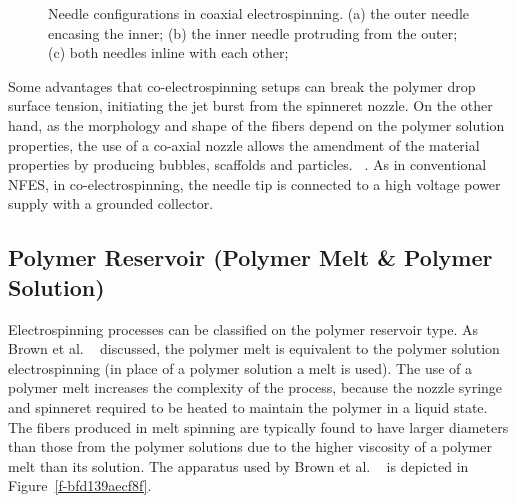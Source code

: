 \bgroup
\begin{figure}[!htbp]
\centering \makeatletter{}
\makeatother 
\caption{{Needle configurations in coaxial electrospinning. (a) the outer needle encasing the inner; (b) the inner needle protruding from the outer; (c) both needles inline with each other;}}
\label{f-4a5ffd16c3ab}
\end{figure}
\egroup
Some advantages that co-electrospinning setups can break the polymer drop surface tension, initiating the jet burst from the spinneret nozzle. On the other hand, as the morphology and shape of the fibers depend on the polymer solution properties, the use of a co-axial nozzle allows the amendment of the material properties by producing bubbles, scaffolds and particles. \unskip~\cite{527120:13914748,527120:13914750}. As in conventional NFES, in co-electrospinning, the needle tip is connected to a high voltage power supply with a grounded collector.



\subsection{Polymer Reservoir (Polymer Melt \& Polymer Solution)}Electrospinning processes can be classified on the polymer reservoir type. As Brown et al. \unskip~\cite{527120:13445499} discussed, the polymer melt is equivalent to the polymer solution electrospinning (in place of a polymer solution a melt is used). The use of a polymer melt increases the complexity of the process, because the nozzle syringe and spinneret required to be heated to maintain the polymer in a liquid state. The fibers produced in melt spinning are typically found to have larger diameters than those from the polymer solutions due to the higher viscosity of a polymer melt than its solution. The apparatus used by Brown et al. \unskip~\cite{527120:13445499} is depicted in Figure~\ref{f-bfd139aecf8f}.


